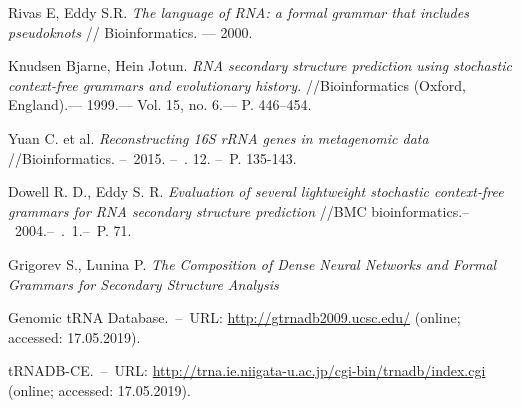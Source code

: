 \documentclass[12pt]{article}  %
\theoremstyle{definition}
\theoremstyle{remark}
\begin{document}
\begin{thebibliography}{7}

Rivas E, Eddy S.R. \emph{The language of RNA: a formal grammar that includes pseudoknots} // Bioinformatics. –– 2000.

Knudsen Bjarne, Hein Jotun. 
\emph{RNA secondary structure prediction using stochastic context-free grammars and evolutionary history.} //Bioinformatics (Oxford, England).–– 1999.–– Vol. 15, no. 6.–– P. 446–454.

Yuan C. et al. \emph{Reconstructing 16S rRNA genes in metagenomic data} //Bioinformatics. --~2015. --~\textnumero. 12. --~P. 135-143.

Dowell R. D., Eddy S. R. 
\emph{Evaluation of several lightweight stochastic context-free grammars for RNA secondary structure prediction} //BMC bioinformatics.--~2004.--~\textnumero .~1.--~P. 71.

Grigorev S., Lunina P.
\emph{The Composition of Dense Neural Networks and Formal Grammars for Secondary Structure Analysis}

Genomic tRNA Database.~--~URL: \url{http://gtrnadb2009.ucsc.edu/} (online; accessed: 17.05.2019).

tRNADB-CE.~--~URL: \url{http://trna.ie.niigata-u.ac.jp/cgi-bin/trnadb/index.cgi} (online; accessed: 17.05.2019).

\end{thebibliography}
\end{document}
